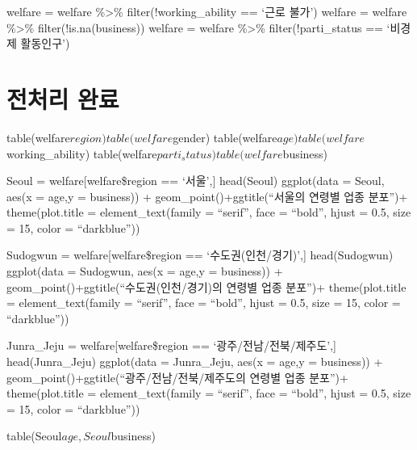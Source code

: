 \documentclass[
]{article}
\begin{document}
welfare = welfare \%\textgreater\% filter(!working\_ability == `근로
불가') welfare = welfare \%\textgreater\% filter(!is.na(business))
welfare = welfare \%\textgreater\% filter(!parti\_status == `비경제
활동인구')

\hypertarget{uxc804uxcc98uxb9ac-uxc644uxb8cc}{%
\section{전처리 완료}\label{uxc804uxcc98uxb9ac-uxc644uxb8cc}}

table(welfare\(region) table(welfare\)gender)
table(welfare\(age) table(welfare\)working\_ability)
table(welfare\(parti_status) table(welfare\)business)

Seoul = welfare{[}welfare\$region == `서울',{]} head(Seoul) ggplot(data
= Seoul, aes(x = age,y = business)) + geom\_point()+ggtitle(``서울의
연령별 업종 분포'')+ theme(plot.title = element\_text(family =
``serif'', face = ``bold'', hjust = 0.5, size = 15, color =
``darkblue''))

Sudogwun = welfare{[}welfare\$region == `수도권(인천/경기)',{]}
head(Sudogwun) ggplot(data = Sudogwun, aes(x = age,y = business)) +
geom\_point()+ggtitle(``수도권(인천/경기)의 연령별 업종 분포'')+
theme(plot.title = element\_text(family = ``serif'', face = ``bold'',
hjust = 0.5, size = 15, color = ``darkblue''))

Junra\_Jeju = welfare{[}welfare\$region == `광주/전남/전북/제주도',{]}
head(Junra\_Jeju) ggplot(data = Junra\_Jeju, aes(x = age,y = business))
+ geom\_point()+ggtitle(``광주/전남/전북/제주도의 연령별 업종 분포'')+
theme(plot.title = element\_text(family = ``serif'', face = ``bold'',
hjust = 0.5, size = 15, color = ``darkblue''))

table(Seoul\(age,Seoul\)business)
\end{document}
